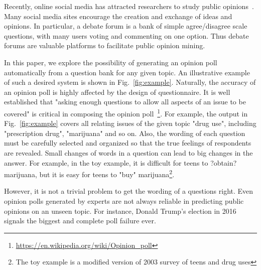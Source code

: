 \documentclass{llncs}
\begin{document}
Recently, online social media has attracted researchers to study public opinions~\cite{OConnor2010tweets,Lampos2013user}. Many social media sites encourage the creation and exchange of ideas and opinions. In particular,  a debate forum is a bank of simple agree/disagree scale questions, with many users voting and commenting on one option. Thus debate forums are valuable platforms to facilitate public opinion mining.


In this paper, we explore the possibility of generating an opinion poll automatically from a question bank for any given topic.  An illustrative example of such a desired system is shown  in Fig.~\ref{fig:example}. Naturally, the accuracy of an opinion poll is highly affected by the design of questionnaire. It is well established that "asking enough questions to allow all aspects of an issue to be covered" is critical in composing the opinion poll~\footnote{\url{https://en.wikipedia.org/wiki/Opinion_poll}}. For example, the output  in Fig.~\ref{fig:example} covers all relating issues of the given topic "drug use", including "prescription drug", "marijuana" and so on. Also, the wording of each question must be carefully selected and organized so that the true feelings of respondents are revealed. Small changes of words in a question can lead to big changes in the answer. For example, in the toy example, it  is difficult for teens to ?obtain?  marijuana, but it is easy for teens to "buy" marijuana\footnote{The toy example is a modified version of 2003 survey of teens and drug uses}.


However, it is not a trivial problem to get the wording of a  questions right. Even opinion polls generated by experts are not always reliable in predicting public opinions on an unseen topic. For instance, Donald Trump's election in 2016 signals the biggest and complete poll failure ever. 
\end{document}
